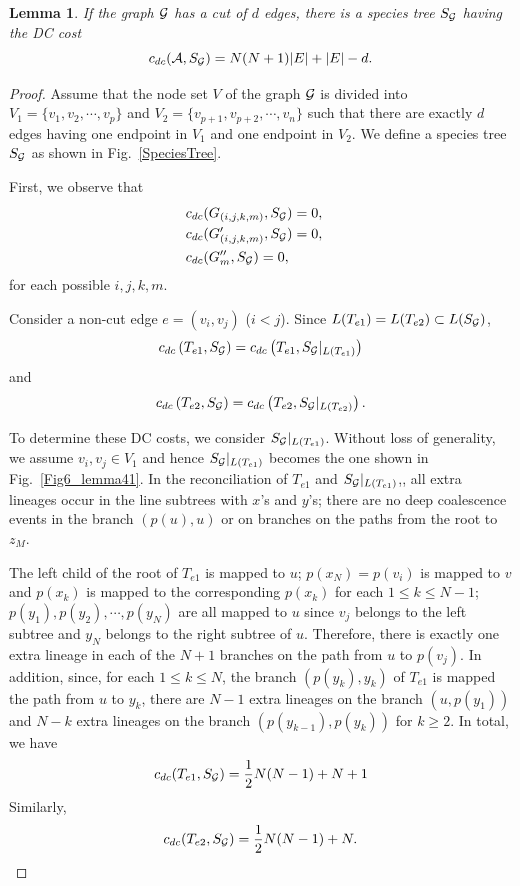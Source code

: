 \documentclass[9.5pt,journal,letterpaper,compsoc]{IEEEtran}
\newtheorem{lemma}{\bf Lemma}[section]
\begin{document}
 \begin{lemma}
\label{lemma1}
   If the graph $\cal G$ has a cut of $d$ edges, there is a
   species tree $S_{\cal G}$ having the DC cost
   $$c_{dc}({\cal A}, S_{\cal G})= N(N+1) |E| + |E| -d.$$
 \end{lemma}
\begin{proof}
  Assume that the node set $V$ of the graph $\cal G$ is divided
 into $V_1=\{v_1,v_2, \cdots, v_p\}$ and $V_2=\{v_{p+1},
 v_{p+2}, \cdots, v_n\}$ such that there are exactly $d$ edges having one
 endpoint in $V_1$ and one endpoint in $V_{2}$.  We define a species
 tree $S_{\cal G}$ as shown in Fig.~\ref{SpeciesTree}.

  First, we observe that
 \begin{eqnarray*}
   & c_{dc}(G_{(i, j, k, m)}, S_{\cal G})=0, &\\
   & c_{dc}(G'_{(i, j, k, m)}, S_{\cal G})=0, &\\
   & c_{dc}(G''_{m}, S_{\cal G})=0,&
 \end{eqnarray*}
for each possible $i, j,k, m$.



 Consider a non-cut edge $e=(v_i, v_j)$ ($i<j$). Since
$L(T_{e1})=L(T_{e2})\subset L(S_{\cal G})$,
$$c_{dc}\left(T_{e1}, S_{\cal G}\right)=c_{dc}\left(T_{e1}, S_{\cal G}|_{L(T_{e1})}\right)$$
 and
$$c_{dc}\left(T_{e2}, S_{\cal G}\right)=c_{dc}\left(T_{e2}, S_{\cal
G}|_{L(T_{e2})}\right).$$

To determine these DC costs, we consider $S_{\cal G}|_{L(T_{e1})}$.
 Without loss of generality, we assume $v_i, v_j \in V_1$ and hence
 $S_{\cal G}|_{L(T_{e1})}$ becomes the one shown in Fig.~\ref{Fig6_lemma41}.
 In the reconciliation of $T_{e1}$ and $S_{\cal G}|_{L(T_{e1})}$,, all extra lineages occur in
the line subtrees with $x$'s and $y$'s; there are no deep
coalescence events in the branch $(p(u), u)$ or on branches on the
paths from the root to $z_M$.


 The left child of the root of
 $T_{e1}$ is mapped to $u$;  $p(x_{N})=p(v_i)$ is mapped to $v$ and
  $p(x_k)$ is mapped to the corresponding $p(x_k)$ for each $1\leq k \leq N-1$;
   $p(y_{1}), p(y_2), \cdots, p(y_{N})$ are all mapped to $u$ since
   $v_j$ belongs to the left subtree  and $y_{N}$  belongs to the
  right subtree of $u$. Therefore,
   there is exactly one
   extra lineage in each of the $N+1$ branches on the path from $u$ to $p(v_j)$.
   In addition, since, for each $1\leq k\leq N$, the branch $(p(y_k), y_k)$
   of $T_{e1}$ is mapped the path from $u$ to $y_k$, there are $N-1$
   extra lineages  on the branch $(u, p(y_1))$ and $N-k$ extra
   lineages on the branch $(p(y_{k-1}), p(y_{k}))$ for $k\geq 2$.
   In total, we have
    \begin{eqnarray*}
       c_{dc}(T_{e1}, S_{\cal G})= \frac{1}{2}N(N-1)+ N + 1\\
    \end{eqnarray*}
    Similarly,
     \begin{eqnarray*}
c_{dc}(T_{e2}, S_{\cal G})= \frac{1}{2}N(N-1)+ N.
    \end{eqnarray*}




\end{proof}
\end{document}
